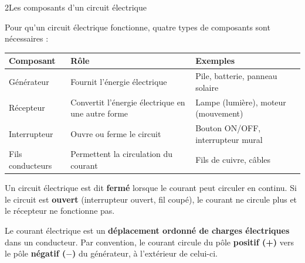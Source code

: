\documentclass[11pt,a4paper]{article}
\renewcommand{\arraystretch}{1.8}
\begin{document}
\vspace{4mm}


\begin{docdoc}{2}{Les composants d'un circuit électrique}

Pour qu'un circuit électrique fonctionne, quatre types de composants sont nécessaires :

\begin{center}
\renewcommand{\arraystretch}{1.6}
\begin{tabularx}{\linewidth}{|l|X|X|}
\hline
\textbf{Composant} & \textbf{Rôle} & \textbf{Exemples} \\
\hline
Générateur & Fournit l'énergie électrique & Pile, batterie, panneau solaire \\
\hline
Récepteur & Convertit l'énergie électrique en une autre forme & Lampe (lumière), moteur (mouvement) \\
\hline
Interrupteur & Ouvre ou ferme le circuit & Bouton ON/OFF, interrupteur mural \\
\hline
Fils conducteurs & Permettent la circulation du courant & Fils de cuivre, câbles \\
\hline
\end{tabularx}
\end{center}

\vspace{3mm}

Un circuit électrique est dit \textbf{fermé} lorsque le courant peut circuler en continu. Si le circuit est \textbf{ouvert} (interrupteur ouvert, fil coupé), le courant ne circule plus et le récepteur ne fonctionne pas.

\vspace{2mm}
Le courant électrique est un \textbf{déplacement ordonné de charges électriques} dans un conducteur. Par convention, le courant circule du pôle \textbf{positif (+)} vers le pôle \textbf{négatif ($-$)} du générateur, à l'extérieur de celui-ci.

\end{docdoc}

\vspace{4mm}

\end{document}

